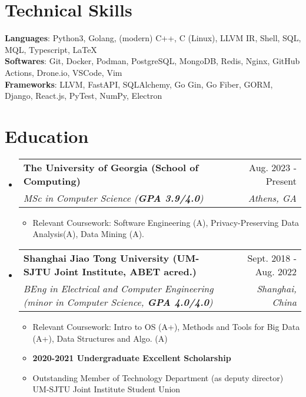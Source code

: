 \documentclass[letterpaper,11pt]{article}
\makeatletter
\newcommand{\resumeItem}[1]{
  \item\small{
    {#1 \vspace{-2pt}}
  }
}
\newcommand{\resumeSubHeader}[4]{
  \vspace{-2pt}\item
    \begin{tabular*}{0.98\textwidth}[t]{l@{\extracolsep{\fill}}r}
      \textbf{#1} & #2 \\
      \textit{\small#3} & \textit{\small #4} \\
    \end{tabular*}\vspace{-7pt}
}
\newcommand{\resumeSubHeaderListStart}{\begin{itemize}[leftmargin=0.15in, label={}]}
\newcommand{\resumeSubHeaderListEnd}{\end{itemize}}
\newcommand{\resumeItemListStart}{\begin{itemize}}
\newcommand{\resumeItemListEnd}{\end{itemize}\vspace{-5pt}}
\makeatother
\begin{document}
\section{Technical Skills}
 \begin{itemize}[leftmargin=0.15in, label={}]
  \setlength\itemsep{0em}
    \small{
      \setlength\itemsep{0em}
      \item{
     \textbf{Languages}{: Python3, Golang, (modern) C++, C (Linux), LLVM IR, Shell, SQL, MQL, Typescript, \LaTeX} \\
     \textbf{Softwares}{: Git, Docker, Podman, PostgreSQL, MongoDB, Redis, Nginx, GitHub Actions, Drone.io, VSCode, Vim} \\
     \textbf{Frameworks}{: LLVM, FastAPI, SQLAlchemy, Go Gin, Go Fiber, GORM, Django, React.js, PyTest, NumPy, Electron} \\
    }}
 \end{itemize}

\section{Education}
  \resumeSubHeaderListStart
    \resumeSubHeader
      {The University of Georgia (School of Computing)}{Aug. 2023 - Present}
      {MSc in Computer Science (\textbf{GPA 3.9/4.0})}{Athens, GA}
      \resumeItemListStart
        \resumeItem{Relevant Coursework: Software Engineering (A), Privacy-Preserving Data Analysis(A), Data Mining (A).}
      \resumeItemListEnd
    \resumeSubHeader
      {Shanghai Jiao Tong University (UM-SJTU Joint Institute, ABET acred.)}{Sept. 2018 - Aug. 2022}
      {BEng in Electrical and Computer Engineering (minor in Computer Science, \textbf{GPA 4.0/4.0})}{Shanghai, China}
      \resumeItemListStart
        \resumeItem{Relevant Coursework: Intro to OS (A+), Methods and Tools for Big Data (A+), Data Structures and Algo. (A)}
        \resumeItem{\textbf{2020-2021 Undergraduate Excellent Scholarship}}
        \resumeItem{Outstanding Member of Technology Department (as deputy director) UM-SJTU Joint Institute Student Union}
      \resumeItemListEnd
  \resumeSubHeaderListEnd

\end{document}
